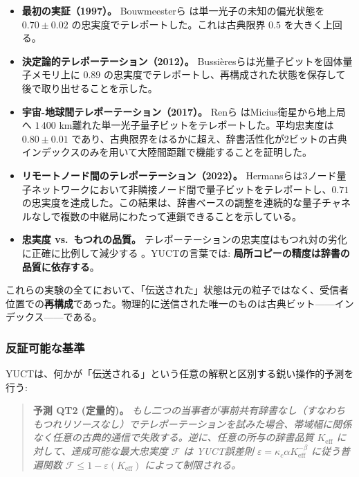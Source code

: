 \documentclass[12pt,a4paper]{article}
\theoremstyle{definition}
\theoremstyle{remark}
\begin{document}
	\begin{itemize}
		\item \textbf{最初の実証（1997）。} Bouwmeesterら \cite{Bouwmeester1997} は単一光子の未知の偏光状態を $0.70 \pm 0.02$ の忠実度でテレポートした。これは古典限界 $0.5$ を大きく上回る。
		\item \textbf{決定論的テレポーテーション（2012）。} Bussièresらは光量子ビットを固体量子メモリ上に $0.89$ の忠実度でテレポートし、再構成された状態を保存して後で取り出せることを示した。
		\item \textbf{宇宙-地球間テレポーテーション（2017）。} Renら \cite{Ren2017} はMicius衛星から地上局へ $1\,400$ km離れた単一光子量子ビットをテレポートした。平均忠実度は $0.80 \pm 0.01$ であり、古典限界をはるかに超え、辞書活性化が2ビットの古典インデックスのみを用いて大陸間距離で機能することを証明した。
		\item \textbf{リモートノード間のテレポーテーション（2022）。} Hermansらは3ノード量子ネットワークにおいて非隣接ノード間で量子ビットをテレポートし、$0.71$ の忠実度を達成した。この結果は、辞書ベースの調整を連続的な量子チャネルなしで複数の中継局にわたって連鎖できることを示している。
		\item \textbf{忠実度 vs.\ もつれの品質。} テレポーテーションの忠実度はもつれ対の劣化に正確に比例して減少する \cite{Knill2005}。YUCTの言葉では: \textbf{局所コピーの精度は辞書の品質に依存する}。
	\end{itemize}
	
	これらの実験の全てにおいて、「伝送された」状態は元の粒子ではなく、受信者位置での\textbf{再構成}であった。物理的に送信された唯一のものは古典ビット——インデックス——である。
	
	\subsubsection{反証可能な基準}
	
	YUCTは、何かが「伝送される」という任意の解釈と区別する鋭い操作的予測を行う:
	
	\begin{quote}
		\textbf{予測 QT2 (定量的)。} \emph{もし二つの当事者が事前共有辞書なし（すなわちもつれリソースなし）でテレポーテーションを試みた場合、帯域幅に関係なく任意の古典的通信で失敗する。逆に、任意の所与の辞書品質 $K_{\mathrm{eff}}$ に対して、達成可能な最大忠実度 $\mathcal{F}$ は YUCT誤差則 $\varepsilon = \kappa_c \alpha K_{\mathrm{eff}}^{-\beta}$ に従う普遍関数 $\mathcal{F} \le 1 - \varepsilon(K_{\mathrm{eff}})$ によって制限される。}
	\end{quote}
	
\end{document}
